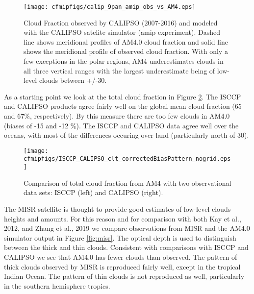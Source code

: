 \documentclass[11pt]{article}   	%
\begin{document}
\begin{figure}
  \texttt{[image: cfmipfigs/calip\_9pan\_amip\_obs\_vs\_AM4.eps]}
  \caption{Cloud Fraction observed by CALIPSO (2007-2016) and modeled with the CALIPSO satelite simulator 
  (amip experiment).
  Dashed line shows meridional profiles of AM4.0 cloud fraction and solid line shows
  the meridional profile of observed cloud fraction.  With only a few exceptions in the polar regions, AM4 underestimates
  clouds in all three vertical ranges with the largest underestimate being of low-level clouds between +/-30.}
  \label{fig:calipso_9pan}
\end{figure}

As a starting point we look at the total cloud fraction in Figure \ref{fig:clt_isccp_calipso}.  The ISCCP and 
CALIPSO products agree fairly well on the 
global mean cloud fraction (65 and 67\%, respectively).   By this measure there are too few clouds in AM4.0 
(biases of -15 and -12 \%).   The ISCCP and CALIPSO data agree well over the oceans, with most of the differences
occuring over land (particularly north of 30).    

\begin{figure}
  \texttt{[image: cfmipfigs/ISCCP\_CALIPSO\_clt\_correctedBiasPattern\_nogrid.eps]}
  \caption{Comparison of total cloud fraction from AM4 with two observational data sets: ISCCP (left) and CALIPSO (right).}
  \label{fig:clt_isccp_calipso}
\end{figure}

The MISR satellite is thought to provide good estimates of low-level clouds heights and amounts.  For this reason
and for comparison with both Kay et al., 2012, and Zhang et al., 2019 we compare observations from MISR
and the AM4.0 simulator output in Figure \ref{fig:misr}.  The optical depth is used to distinguish
between the thick and thin clouds.  Consistent with comparisons with ISCCP and CALIPSO we see that AM4.0
has fewer clouds than observed.  The pattern of thick clouds observed by MISR is reproduced fairly well, except in 
the tropical Indian Ocean.  The pattern of thin clouds is not reproduced as well, particularly in the southern hemisphere 
tropics.   
\end{document}
